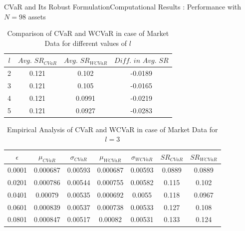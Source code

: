 \documentclass{beamer}
\begin{document}
\begin{frame}{CVaR and Its Robust Formulation}{Computational Results : Performance with $N=98$ assets}
\begin{table}[!h]
    \centering
    \small
    \captionsetup{justification=centering}

   \begin{tabular}{||c|c|c|c||}
   \hline
  
$l$ & $Avg. \, \, SR_{CVaR}$ & $Avg. \, \, SR_{WCVaR}$ & $Diff. \, \, in \, \, Avg. \, \, SR$ \\
  
  \hline
2 & 0.121 & 0.102 & -0.0189 \\
3 & 0.121 & 0.105 & -0.0165 \\
4 & 0.121 & 0.0991 & -0.0219 \\
5 & 0.121 & 0.0927 & -0.0283 \\
  \hline
\end{tabular}
    \caption{Comparison of CVaR and WCVaR in case of Market Data for different values of $l$}
    \label{avgtab:6.4}
\end{table}

\begin{table}[!h]
    \centering
    \small
    \captionsetup{justification=centering}

   \begin{tabular}{||c|c|c|c|c|c|c||}
   \hline
  
$\epsilon$ & $\mu_{CVaR}$ & $\sigma_{CVaR}$ & $\mu_{WCVaR}$ & $\sigma_{WCVaR}$ & $SR_{CVaR}$ & $SR_{WCVaR}$\\
  
  \hline
0.0001 & 0.000687 & 0.00593 & 0.000687 & 0.00593 & 0.0889 & 0.0889 \\
0.0201 & 0.000786 & 0.00544 & 0.000755 & 0.00582 & 0.115 & 0.102 \\
0.0401 & 0.00079 & 0.00535 & 0.000692 & 0.0055 & 0.118 & 0.0967 \\
0.0601 & 0.000839 & 0.00537 & 0.000738 & 0.00533 & 0.127 & 0.108 \\
0.0801 & 0.000847 & 0.00517 & 0.00082 & 0.00531 & 0.133 & 0.124 \\
  \hline
\end{tabular}
    \caption{Empirical Analysis of CVaR and WCVaR in case of Market Data for $l=3$}
    \label{tab:6.4}
\end{table}


\end{frame}
\end{document}
